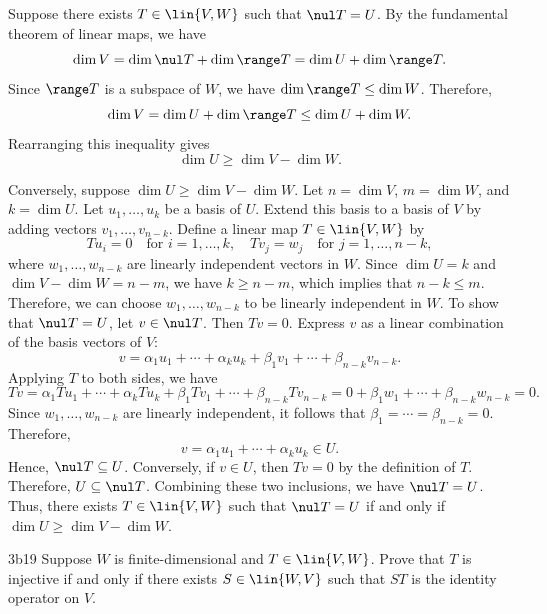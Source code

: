 \begin{sol}
    Suppose there exists $T \in \lin{V, W}$ such that $\nul T = U$.
	By the fundamental theorem of linear maps, we have
    \[
    	\dim V = \dim \nul T + \dim \range T = \dim U + \dim \range T.
    \]
    Since $\range T$ is a subspace of $W$, we have $\dim \range T \leq \dim W$.
	Therefore,
    \[
    	\dim V = \dim U + \dim \range T \leq \dim U + \dim W.
    \]
    Rearranging this inequality gives
    \[
    	\dim U \geq \dim V - \dim W.
    \]

    Conversely, suppose $\dim U \geq \dim V - \dim W$.
	Let $n = \dim V$, $m = \dim W$, and $k = \dim U$.
	Let $u_1, \ldots, u_k$ be a basis of $U$.
	Extend this basis to a basis of $V$ by adding vectors $v_1, \ldots, v_{n - k}$.
	Define a linear map $T \in \lin{V, W}$ by
    \[
    	Tu_i = 0 \quad \text{for } i = 1, \ldots, k, \quad Tv_j = w_j \quad \text{for } j = 1, \ldots, n - k,
    \]
    where $w_1, \ldots, w_{n - k}$ are linearly independent vectors in $W$.
	Since $\dim U = k$ and $\dim V - \dim W = n - m$, we have $k \geq n - m$, which implies that $n - k \leq m$.
	Therefore, we can choose $w_1, \ldots, w_{n - k}$ to be linearly independent in $W$.
	To show that $\nul T = U$, let $v \in \nul T$.
	Then $Tv = 0$.
	Express $v$ as a linear combination of the basis vectors of $V$:
    \[
    	v = \alpha_1 u_1 + \cdots + \alpha_k u_k + \beta_1 v_1 + \cdots + \beta_{n - k} v_{n - k}.
    \]
    Applying $T$ to both sides, we have
    \[
    	Tv = \alpha_1 Tu_1 + \cdots + \alpha_k Tu_k + \beta_1 Tv_1 + \cdots + \beta_{n - k} Tv_{n - k} = 0 + \beta_1 w_1 + \cdots + \beta_{n - k} w_{n - k} = 0.
    \]
    Since $w_1, \ldots, w_{n - k}$ are linearly independent, it follows that $\beta_1 = \cdots = \beta_{n - k} = 0$.
	Therefore,
    \[
    	v = \alpha_1 u_1 + \cdots + \alpha_k u_k \in U.
    \]
    Hence, $\nul T \subseteq U$.
	Conversely, if $v \in U$, then $Tv = 0$ by the definition of $T$.
	Therefore, $U \subseteq \nul T$.
	Combining these two inclusions, we have $\nul T = U$.
	Thus, there exists $T \in \lin{V, W}$ such that $\nul T = U$ if and only if $\dim U \geq \dim V - \dim W$.
\end{sol}

\begin{exercise}{3b19}
    Suppose $W$ is finite-dimensional and $T \in \lin{V, W}$.
	Prove that $T$ is injective if and only if there exists $S \in \lin{W, V}$ such that $ST$ is the identity operator on $V$.
\end{exercise}

